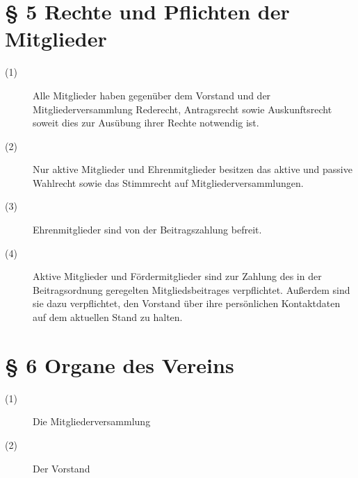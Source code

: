 \documentclass[a4paper,12pt]{scrartcl}
\begin{document}
\section*{\S{} 5 Rechte und Pflichten der Mitglieder}
\begin{description} 

\item[(1)] Alle Mitglieder haben gegenüber dem Vorstand und der Mitgliederversammlung Rederecht, Antragsrecht sowie Auskunftsrecht soweit dies zur Ausübung ihrer Rechte notwendig ist. 
\item[(2)] Nur aktive Mitglieder und Ehrenmitglieder besitzen das aktive und passive Wahlrecht sowie das Stimmrecht auf Mitgliederversammlungen.
\item[(3)] Ehrenmitglieder sind von der Beitragszahlung befreit.
\item[(4)] Aktive Mitglieder und Fördermitglieder sind zur Zahlung des in der Beitragsordnung geregelten Mitgliedsbeitrages verpflichtet. Außerdem sind sie dazu verpflichtet, den Vorstand über ihre persönlichen Kontaktdaten auf dem aktuellen Stand zu halten.

\end{description}



\section*{\S{} 6 Organe des Vereins}
\begin{description} 

\item[(1)] Die Mitgliederversammlung
\item[(2)] Der Vorstand

\end{description}
\end{document}
